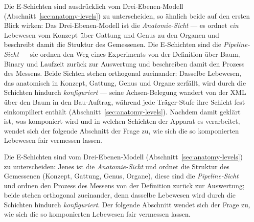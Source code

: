 \begin{nurlang}
Die E-Schichten sind ausdrücklich vom Drei-Ebenen-Modell (Abschnitt~\ref{sec:anatomy-levels}) zu
unterscheiden, so ähnlich beide auf den ersten Blick wirken: Das Drei-Ebenen-Modell ist die
\emph{Anatomie-Sicht} --- es ordnet \emph{ein} Lebewesen vom Konzept über Gattung und Genus zu den
Organen und beschreibt damit die Struktur des Gemessenen. Die E-Schichten sind die \emph{Pipeline-Sicht}
--- sie ordnen den Weg eines Experiments von der Definition über Baum, Binary und Laufzeit zurück zur
Auswertung und beschreiben damit den Prozess des Messens. Beide Sichten stehen orthogonal zueinander:
Dasselbe Lebewesen, das anatomisch in Konzept, Gattung, Genus und Organe zerfällt, wird durch die Schichten
hindurch \emph{konfiguriert} --- seine Achsen-Belegung wandert von der XML über den Baum in den
Bau-Auftrag, während jede Träger-Stufe ihre Schicht fest einkompiliert enthält
(Abschnitt~\ref{sec:anatomy-levels}). Nachdem damit geklärt ist, was komponiert wird und in welchen
Schichten der Apparat es verarbeitet, wendet sich der folgende Abschnitt der Frage zu, wie sich die so
komponierten Lebewesen fair vermessen lassen.
\end{nurlang}
\begin{nurkurz}
Die E-Schichten sind vom Drei-Ebenen-Modell (Abschnitt~\ref{sec:anatomy-levels}) zu unterscheiden: Jenes ist die
\emph{Anatomie-Sicht} und ordnet die Struktur des Gemessenen (Konzept, Gattung, Genus, Organe), diese sind die
\emph{Pipeline-Sicht} und ordnen den Prozess des Messens von der Definition zurück zur Auswertung; beide stehen
orthogonal zueinander, denn dasselbe Lebewesen wird durch die Schichten hindurch \emph{konfiguriert}. Der
folgende Abschnitt wendet sich der Frage zu, wie sich die so komponierten Lebewesen fair vermessen lassen.
\end{nurkurz}

